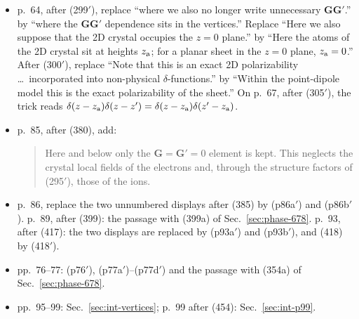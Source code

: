 \documentclass[11pt]{article}
\begin{document}
\begin{itemize}
\begin{quote}
current vertices. It is the response of $s$ interpenetrating gratings of point dipoles, one per
sublattice, each displaced by $\mathbf r^0_{\rm a}$ from the Bravais lattice. Its $\mathbf G=\mathbf G'=0$
element is the macroscopic response used in Secs.~6.1--8.
\end{quote}
\item p.~64, after (299$'$), replace ``where we also no longer write unnecessary $\mathbf G\mathbf G'$.'' by
``where the $\mathbf G\mathbf G'$ dependence sits in the vertices.'' Replace ``Here we also suppose that
the 2D crystal occupies the $z=0$ plane.'' by ``Here the atoms of the 2D crystal sit at heights
$z_{\rm a}$; for a planar sheet in the $z=0$ plane, $z_{\rm a}=0$.'' After (300$'$), replace ``Note that this
is an exact 2D polarizability \ldots\ incorporated into non-physical $\delta$-functions.'' by ``Within
the point-dipole model this is the exact polarizability of the sheet.'' On p.~67, after (305$'$), the
trick reads $\delta(z-z_{\rm a})\delta(z-z')=\delta(z-z_{\rm a})\delta(z'-z_{\rm a})$.
\item p.~85, after (380), add:
\begin{quote}
Here and below only the $\mathbf G=\mathbf G'=0$ element is kept. This neglects the crystal local fields
of the electrons and, through the structure factors of (295$'$), those of the ions.
\end{quote}
\item p.~86, replace the two unnumbered displays after (385) by (p86a$'$) and (p86b$'$). p.~89, after
(399): the passage with (399a) of Sec.~\ref{sec:phase-678}. p.~93, after (417): the two displays are
replaced by (p93a$'$) and (p93b$'$), and (418) by (418$'$).
\item pp.~76--77: (p76$'$), (p77a$'$)--(p77d$'$) and the passage with (354a) of Sec.~\ref{sec:phase-678}.
\item pp.~95--99: Sec.~\ref{sec:int-vertices}; p.~99 after (454): Sec.~\ref{sec:int-p99}.
\end{itemize}
\end{document}
